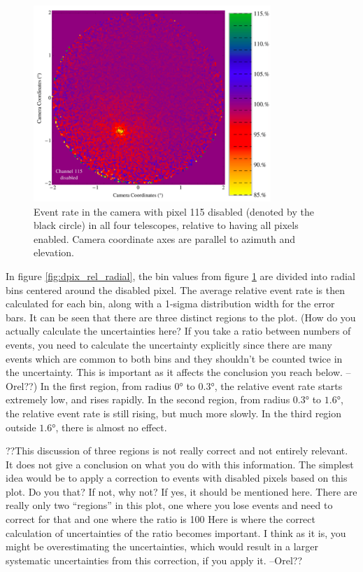     \begin{figure}[ht]
      \begin{center}
        \includegraphics[width=0.8\textwidth]{images/disabled_pixel/relativerate_camera}
        \caption[Relative Event Rate]{Event rate in the camera with pixel 115 disabled (denoted by the black circle) in all four telescopes, relative to having all pixels enabled.  Camera coordinate axes are parallel to azimuth and elevation.}\label{fig:dpix_rel_camera}
      \end{center}
    \end{figure}

    In figure \ref{fig:dpix_rel_radial}, the bin values from figure \ref{fig:dpix_rel_camera} are divided into radial bins centered around the disabled pixel.
    The average relative event rate is then calculated for each bin, along with a 1-sigma distribution width for the error bars.
    It can be seen that there are three distinct regions to the plot.
    (How do you actually calculate the uncertainties here? If you take a ratio between numbers of events, you need to calculate the uncertainty explicitly since there are many events which are common to both bins and they shouldn’t be counted twice in the uncertainty.  This is important as it affects the conclusion you reach below. --Orel??)
    In the first region, from radius $\ang{0}$ to $\ang{0.3}$, the relative event rate starts extremely low, and rises rapidly.
    In the second region, from radius $\ang{0.3}$ to $\ang{1.6}$, the relative event rate is still rising, but much more slowly.
    In the third region outside $\ang{1.6}$, there is almost no effect.

    ??This discussion of three regions is not really correct and not entirely relevant.
    It does not give a conclusion on what you do with this information.
    The simplest idea would be to apply a correction to events with disabled pixels based on this plot. Do you that? If not, why not? If yes, it should be mentioned here.
    There are really only two “regions” in this plot, one where you lose events and need to correct for that and one where the ratio is 100%
    Here is where the correct calculation of uncertainties of the ratio becomes important.
    I think as it is, you might be overestimating the uncertainties, which would result in a larger systematic uncertainties from this correction, if you apply it. --Orel??


